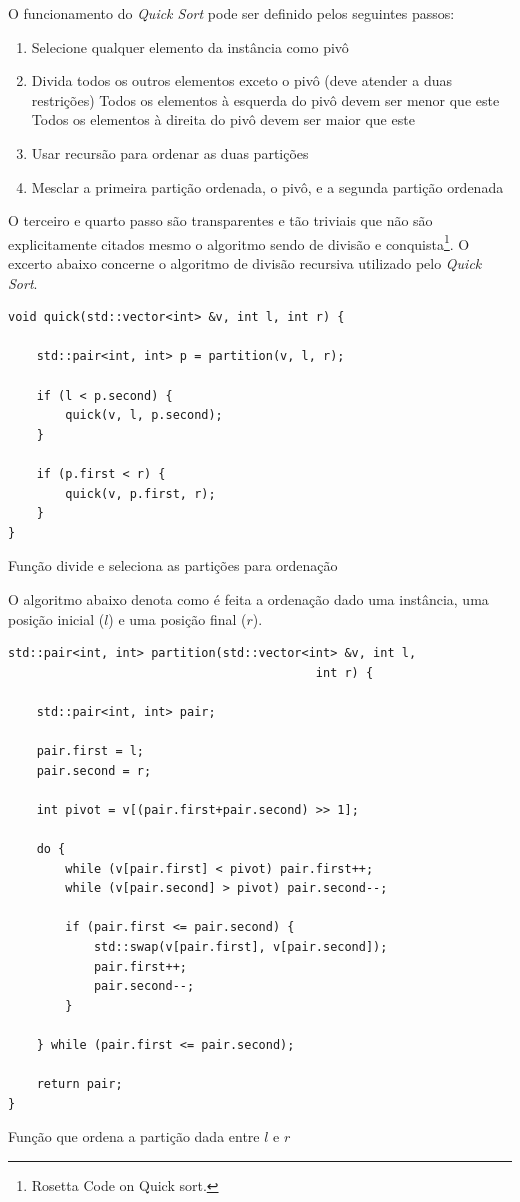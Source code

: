 \documentclass[a4paper, 12pt]{report}
\begin{document}
O funcionamento do \emph{Quick Sort} pode ser definido pelos seguintes passos:

\begin{enumerate}
\item Selecione qualquer elemento da instância como pivô
\item Divida todos os outros elementos exceto o pivô (deve atender a duas restrições)
Todos os elementos à esquerda do pivô devem ser menor que este
Todos os elementos à direita do pivô devem ser maior que este
\item Usar recursão para ordenar as duas partições
\item Mesclar a primeira partição ordenada, o pivô, e a segunda partição ordenada
\end{enumerate}

O terceiro e quarto passo são transparentes e tão triviais que não são
explicitamente citados mesmo o algoritmo sendo de divisão e conquista\footnote{Rosetta Code on Quick sort.}.
O excerto abaixo concerne o algoritmo de divisão recursiva utilizado pelo
\emph{Quick Sort}.

\begin{listing}[H]
\begin{verbatim}
void quick(std::vector<int> &v, int l, int r) {

    std::pair<int, int> p = partition(v, l, r);

    if (l < p.second) {
        quick(v, l, p.second);
    }

    if (p.first < r) {
        quick(v, p.first, r);
    }
}
\end{verbatim}
\caption{Função divide e seleciona as partições para ordenação}
\end{listing}

O algoritmo abaixo denota como é feita a ordenação dado uma instância, uma
posição inicial ($l$) e uma posição final ($r$).

\begin{listing}[H]
\begin{verbatim}
std::pair<int, int> partition(std::vector<int> &v, int l,
                                           int r) {

    std::pair<int, int> pair;

    pair.first = l;
    pair.second = r;

    int pivot = v[(pair.first+pair.second) >> 1];

    do {
        while (v[pair.first] < pivot) pair.first++;
        while (v[pair.second] > pivot) pair.second--;

        if (pair.first <= pair.second) {
            std::swap(v[pair.first], v[pair.second]);
            pair.first++;
            pair.second--;
        }

    } while (pair.first <= pair.second);

    return pair;
}
\end{verbatim}
\caption{Função que ordena a partição dada entre $l$ e $r$}
\end{listing}
\end{document}
